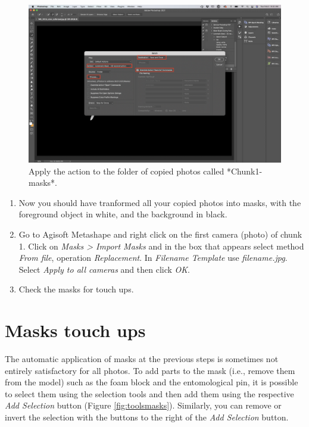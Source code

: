 \documentclass[
]{book}
\begin{document}
\begin{figure}

{\centering \includegraphics[width=1\linewidth]{Figures/mask_4} 

}

\caption{Apply the action to the folder of copied photos called *Chunk1-masks*.}\label{fig:mask4}
\end{figure}

\begin{enumerate}
\def\labelenumi{\arabic{enumi}.}
\setcounter{enumi}{4}
\item
  Now you should have tranformed all your copied photos into masks,
  with the foreground object in white, and the background in black.
\item
  Go to Agisoft Metashape and right click on the first camera (photo)
  of chunk 1. Click on \emph{Masks \textgreater{} Import Masks} and in the box that
  appears select method \emph{From file}, operation \emph{Replacement}. In
  \emph{Filename Template} use \emph{filename.jpg}. Select \emph{Apply to all
  cameras} and then click \emph{OK}.
\item
  Check the masks for touch ups.
\end{enumerate}

\hypertarget{masks-touch-ups}{%
\section{Masks touch ups}\label{masks-touch-ups}}

The automatic application of masks at the previous steps is sometimes
not entirely satisfactory for all photos. To add parts to the mask (i.e., remove
them from the model) such as the foam block and the entomological pin, it is possible
to select them using the selection tools and then add them using the respective
\emph{Add Selection} button (Figure \ref{fig:toolsmasks}). Similarly, you can remove or
invert the selection with the buttons to the right of the \emph{Add Selection} button.
\end{document}
